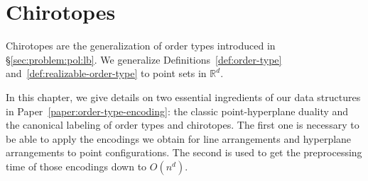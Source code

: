 \chapter{Chirotopes}%
\label{chapter:chirotopes}

Chirotopes are the generalization of order types introduced in
\S\ref{sec:problem:pol:lb}.
%
We generalize Definitions~\ref{def:order-type}
and~\ref{def:realizable-order-type} to point sets in \(\mathbb{R}^d\).
%


In this chapter,
we give details on two essential ingredients of our data structures in
Paper~\ref{paper:order-type-encoding}:
the classic point-hyperplane duality
and
the canonical labeling of order types and chirotopes.
%
The first one is necessary to be able to apply the encodings we obtain
for line arrangements
and hyperplane arrangements to point configurations.
%
The second is used to get the preprocessing time of those encodings down to
\(O(n^d)\).




